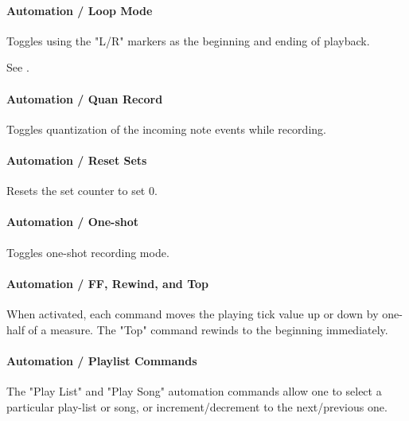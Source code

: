 
\paragraph{Automation / Loop Mode}
\label{paragraph:configuration_midi_loop_mode}

   Toggles using the "L/R" markers as the beginning and ending
   of playback.

   See .

\paragraph{Automation / Quan Record}
\label{paragraph:configuration_midi_quanrecord}

   Toggles quantization of the incoming note events while recording.

\paragraph{Automation / Reset Sets}
\label{paragraph:configuration_midi_reset_sets}

   Resets the set counter to set 0.

\paragraph{Automation / One-shot}
\label{paragraph:configuration_midi_one_shot}

   Toggles one-shot recording mode.

\paragraph{Automation / FF, Rewind, and Top}
\label{paragraph:configuration_midi_ff_rewind_top}

   When activated, each command moves the playing tick value up or down
   by one-half of a measure.
   The "Top" command rewinds to the beginning immediately.

\paragraph{Automation / Playlist Commands}
\label{paragraph:configuration_midi_playlist_commands}

   The "Play List" and "Play Song" automation commands allow one
   to select a particular play-list or song,
   or increment/decrement to the next/previous one.

